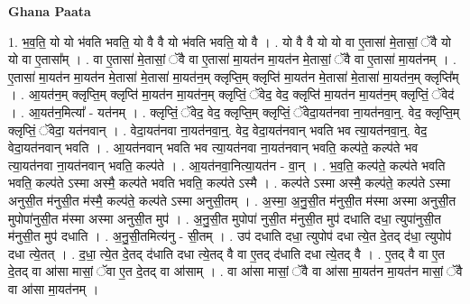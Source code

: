 \documentclass[17pt]{extarticle}
\begin{document}
\textbf{Ghana Paata } \newline

1. भ॒व॒ति॒ यो यो भ॑वति भवति॒ यो वै वै यो भ॑वति भवति॒ यो वै । . यो वै वै यो यो वा ए॒तासा॑ मे॒तासां॒ ॅवै यो यो वा ए॒तासा᳚म् । . वा ए॒तासा॑ मे॒तासां॒ ॅवै वा ए॒तासा॑ मा॒यत॑न मा॒यत॑न मे॒तासां॒ ॅवै वा ए॒तासा॑ मा॒यत॑नम् । . ए॒तासा॑ मा॒यत॑न मा॒यत॑न मे॒तासा॑ मे॒तासा॑ मा॒यत॑न॒म् क्लृप्ति॒म् क्लृप्ति॑ मा॒यत॑न मे॒तासा॑ मे॒तासा॑ मा॒यत॑न॒म् क्लृप्ति᳚म् । . आ॒यत॑न॒म् क्लृप्ति॒म् क्लृप्ति॑ मा॒यत॑न मा॒यत॑न॒म् क्लृप्तिं॒ ॅवेद॒ वेद॒ क्लृप्ति॑ मा॒यत॑न मा॒यत॑न॒म् क्लृप्तिं॒ ॅवेद॑ । . आ॒यत॑न॒मित्या᳚ - यत॑नम् । . क्लृप्तिं॒ ॅवेद॒ वेद॒ क्लृप्ति॒म् क्लृप्तिं॒ ॅवेदा॒यत॑नवा ना॒यत॑नवा॒न्॒. वेद॒ क्लृप्ति॒म् क्लृप्तिं॒ ॅवेदा॒ यत॑नवान् । . वेदा॒यत॑नवा ना॒यत॑नवा॒न्॒. वेद॒ वेदा॒यत॑नवान् भवति भव त्या॒यत॑नवा॒न्॒. वेद॒ वेदा॒यत॑नवान् भवति । . आ॒यत॑नवान् भवति भव त्या॒यत॑नवा ना॒यत॑नवान् भवति॒ कल्प॑ते॒ कल्प॑ते भव त्या॒यत॑नवा ना॒यत॑नवान् भवति॒ कल्प॑ते । . आ॒यत॑नवा॒नित्या॒यत॑न - वा॒न् । . भ॒व॒ति॒ कल्प॑ते॒ कल्प॑ते भवति भवति॒ कल्प॑ते ऽस्मा अस्मै॒ कल्प॑ते भवति भवति॒ कल्प॑ते ऽस्मै । . कल्प॑ते ऽस्मा अस्मै॒ कल्प॑ते॒ कल्प॑ते ऽस्मा अनुसी॒त म॑नुसी॒त म॑स्मै॒ कल्प॑ते॒ कल्प॑ते ऽस्मा अनुसी॒तम् । . अ॒स्मा॒ अ॒नु॒सी॒त म॑नुसी॒त म॑स्मा अस्मा अनुसी॒त मुपोपा॑नुसी॒त म॑स्मा अस्मा अनुसी॒त मुप॑ । . अ॒नु॒सी॒त मुपोपा॑ नुसी॒त म॑नुसी॒त मुप॑ दधाति दधा॒ त्युपा॑नुसी॒त म॑नुसी॒त मुप॑ दधाति । . अ॒नु॒सी॒तमित्य॑नु - सी॒तम् । . उप॑ दधाति दधा॒ त्युपोप॑ दधा त्ये॒त दे॒तद् द॑धा॒ त्युपोप॑ दधा त्ये॒तत् । . द॒धा॒ त्ये॒त दे॒तद् द॑धाति दधा त्ये॒तद् वै वा ए॒तद् द॑धाति दधा त्ये॒तद् वै । . ए॒तद् वै वा ए॒त दे॒तद् वा आ॑सा मासां॒ ॅवा ए॒त दे॒तद् वा आ॑साम् । . वा आ॑सा मासां॒ ॅवै वा आ॑सा मा॒यत॑न मा॒यत॑न मासां॒ ॅवै वा आ॑सा मा॒यत॑नम् । \newline
\end{document}
